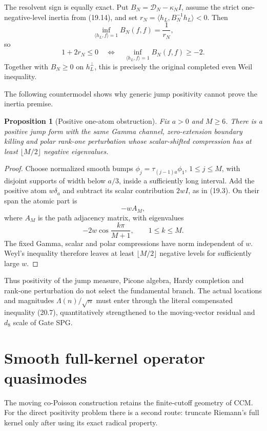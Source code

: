 \documentclass[11pt]{amsart}
\newtheorem{proposition}[theorem]{Proposition}
\theoremstyle{definition}
\theoremstyle{remark}
\begin{document}
The resolvent sign is equally exact.  Put
\(B_N=\mathcal D_N-\kappa_NI\), assume the strict one-negative-level
inertia from (19.14), and set
\(r_N=\langle h_L,B_N^{-1}h_L\rangle<0\).  Then
\[
 \inf_{\langle h_L,f\rangle=1}B_N(f,f)=\frac1{r_N},
\tag{21.5}
\]
so
\[
 1+2r_N\le0
 \quad\Longleftrightarrow\quad
 \inf_{\langle h_L,f\rangle=1}B_N(f,f)\ge-2.
\tag{21.6}
\]
Together with \(B_N\ge0\) on \(h_L^\perp\), this is precisely the original
completed even Weil inequality.

The following countermodel shows why generic jump positivity cannot prove
the inertia premise.

\begin{proposition}[Positive one-atom obstruction]
\label{prop:one-atom}
Fix \(a>0\) and \(M\ge6\).  There is a positive jump form with the same
Gamma channel, zero-extension boundary killing and polar rank-one
perturbation whose scalar-shifted compression has at least
\(\lfloor M/2\rfloor\) negative eigenvalues.
\end{proposition}

\begin{proof}
Choose normalized smooth bumps
\(\phi_j=\tau_{(j-1)a}\phi_1\), \(1\le j\le M\), with disjoint supports
of width below \(a/3\), inside a sufficiently long interval.  Add the
positive atom \(w\delta_a\) and subtract its scalar contribution \(2wI\),
as in (19.3).  On their span the atomic part is
\[
 -wA_M,
\]
where \(A_M\) is the path adjacency matrix, with eigenvalues
\[
 -2w\cos\frac{k\pi}{M+1},
 \qquad1\le k\le M.
\]
The fixed Gamma, scalar and polar compressions have norm independent of
\(w\).  Weyl's inequality therefore leaves at least
\(\lfloor M/2\rfloor\) negative levels for sufficiently large \(w\).
\end{proof}

Thus positivity of the jump measure, Picone algebra, Hardy completion and
rank-one perturbation do not select the fundamental branch.  The actual
locations and magnitudes \(\Lambda(n)/\sqrt n\) must enter through the
literal compensated inequality (20.7), quantitatively strengthened to the
moving-vector residual and \(d_8\) scale of Gate SPG.

\section{Smooth full-kernel operator quasimodes}
\label{sec:full-kernel-quasimode}

The moving co-Poisson construction retains the finite-cutoff geometry of
CCM.  For the direct positivity problem there is a second route: truncate
Riemann's full kernel only after using its exact radical property.
\end{document}
